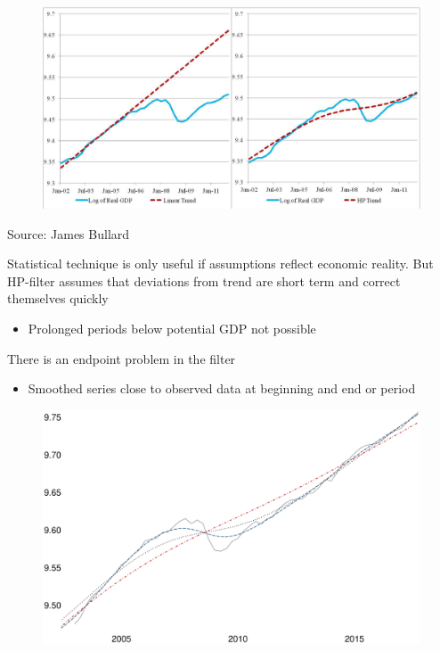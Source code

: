 \documentclass{beamer}
\begin{document}
\begin{frame}
  \begin{figure}
    \includegraphics[scale=.3]{us_potential.eps}
  \end{figure}
  Source: James Bullard
\end{frame}

\begin{frame}
  Statistical technique is only useful if assumptions reflect economic reality.
  But HP-filter assumes that deviations from trend are short term and correct themselves quickly
  \begin{itemize}
    \item Prolonged periods below potential GDP not possible
  \end{itemize}
  \medskip
  There is an endpoint problem in the filter
  \begin{itemize}
    \item Smoothed series close to observed data at beginning and end or period
  \end{itemize}  
\end{frame}

\begin{frame}
  \begin{figure}
     \includegraphics[scale=.3]{hp_lambda.eps}
  \end{figure}
\end{frame}
\end{document}
